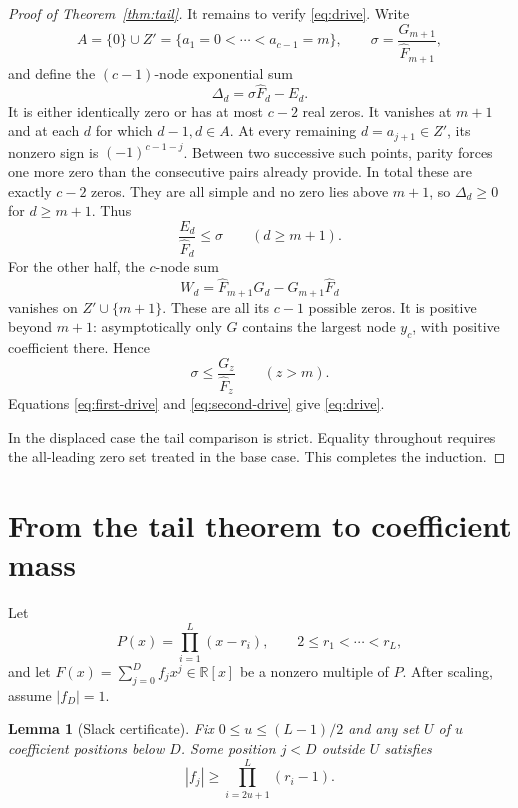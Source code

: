 \documentclass[11pt]{article}
\newtheorem{lemma}[theorem]{Lemma}
\theoremstyle{definition}
\theoremstyle{remark}
\newcommand{\R}{\mathbb R}
\begin{document}
\begin{proof}[Proof of Theorem~\ref{thm:tail}]
It remains to verify \eqref{eq:drive}.  Write
\[
 A=\{0\}\cup Z'=\{a_1=0<\cdots<a_{c-1}=m\},\qquad
 \sigma=\frac{G_{m+1}}{\widehat F_{m+1}},
\]
and define the $(c-1)$-node exponential sum
\[
  \Delta_d=\sigma\widehat F_d-E_d.
\]
It is either identically zero or has at most $c-2$ real zeros.  It vanishes
at $m+1$ and at each $d$ for which $d-1,d\in A$.  At every remaining
$d=a_{j+1}\in Z'$, its nonzero sign is $(-1)^{c-1-j}$.  Between two
successive such points, parity forces one more zero than the consecutive
pairs already provide.  In total these are exactly $c-2$ zeros.  They are
all simple and no zero lies above $m+1$, so $\Delta_d\ge0$ for $d\ge m+1$.
Thus
\begin{equation}\label{eq:first-drive}
  \frac{E_d}{\widehat F_d}\le\sigma\qquad(d\ge m+1).
\end{equation}
For the other half, the $c$-node sum
\[
  W_d=\widehat F_{m+1}G_d-G_{m+1}\widehat F_d
\]
vanishes on $Z'\cup\{m+1\}$.  These are all its $c-1$ possible zeros.  It
is positive beyond $m+1$: asymptotically only $G$ contains the largest node
$y_c$, with positive coefficient there.  Hence
\begin{equation}\label{eq:second-drive}
  \sigma\le\frac{G_z}{\widehat F_z}\qquad(z>m).
\end{equation}
Equations \eqref{eq:first-drive} and \eqref{eq:second-drive} give
\eqref{eq:drive}.

In the displaced case the tail comparison is strict.  Equality throughout
requires the all-leading zero set treated in the base case.  This completes
the induction.
\end{proof}

\section{From the tail theorem to coefficient mass}\label{sec:mass}

Let
\[
  P(x)=\prod_{i=1}^{L}(x-r_i),
  \qquad 2\le r_1<\cdots<r_L,
\]
and let $F(x)=\sum_{j=0}^{D}f_jx^j\in\R[x]$ be a nonzero multiple of $P$.
After scaling, assume $|f_D|=1$.

\begin{lemma}[Slack certificate]\label{lem:slack}
Fix $0\le u\le(L-1)/2$ and any set $U$ of $u$ coefficient positions below
$D$.  Some position $j<D$ outside $U$ satisfies
\begin{equation}\label{eq:threshold}
  |f_j|\ge \prod_{i=2u+1}^{L}(r_i-1).
\end{equation}
\end{lemma}
\end{document}
